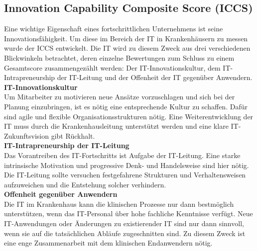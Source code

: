 \subsection{Innovation Capability Composite Score (ICCS)}
	Eine wichtige Eigenschaft eines fortschrittlichen Unternehmens ist seine Innovationsfähigkeit. Um diese im Bereich der IT in Krankenhäusern zu messen wurde der ICCS entwickelt. Die IT wird zu diesem Zweck aus drei verschiedenen Blickwinkeln betrachtet, deren einzelne Bewertungen zum Schluss zu einem Gesamtscore zusammengezählt werden: Der IT-Innovationskultur, dem IT-Intrapreneurship der IT-Leitung und der Offenheit der IT gegenüber Anwendern. \parencite{huebner2019}
	\vspace{\parheadvspace}\\
	\textbf{IT-Innovationskultur}\\
	Um Mitarbeiter zu motivieren neue Ansätze vorzuschlagen und sich bei der Planung einzubringen, ist es nötig eine entsprechende Kultur zu schaffen. Dafür sind agile und flexible Organisationsstrukturen nötig. Eine Weiterentwicklung der IT muss durch die Krankenhausleitung unterstützt werden und eine klare IT-Zukunftsvision gibt Rückhalt.
	\vspace{\parheadvspace}\\
	\textbf{IT-Intrapreneurship der IT-Leitung}\\
	Das Vorantreiben des IT-Fortschritts ist Aufgabe der IT-Leitung. Eine starke intrinsische Motivation und progressive Denk- und Handelsweise sind hier nötig. Die IT-Leitung sollte versuchen festgefahrene Strukturen und Verhaltensweisen aufzuweichen und die Entstehung solcher verhindern.
	\vspace{\parheadvspace}\\
	\textbf{Offenheit gegenüber Anwendern}\\
	Die IT im Krankenhaus kann die klinischen Prozesse nur dann bestmöglich unterstützen, wenn das IT-Personal über hohe fachliche Kenntnisse verfügt. Neue IT-Anwendungen oder Änderungen zu existierender IT sind nur dann sinnvoll, wenn sie auf die tatsächlichen Abläufe zugeschnitten sind. Zu diesem Zweck ist eine enge Zusammenarbeit mit dem klinischen Endanwendern nötig.
